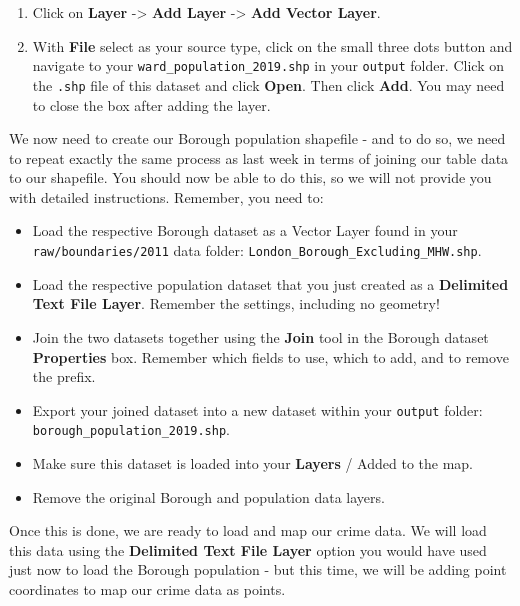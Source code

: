 \documentclass[
]{book}
\begin{document}
\begin{enumerate}
\def\labelenumi{\arabic{enumi}.}
\item
  Click on \textbf{Layer} -\textgreater{} \textbf{Add Layer} -\textgreater{} \textbf{Add Vector Layer}.
\item
  With \textbf{File} select as your source type, click on the small three dots button and navigate to your \texttt{ward\_population\_2019.shp} in your \texttt{output} folder. Click on the \texttt{.shp} file of this dataset and click \textbf{Open}. Then click \textbf{Add}. You may need to close the box after adding the layer.
\end{enumerate}

We now need to create our Borough population shapefile - and to do so, we need to repeat exactly the same process as last week in terms of joining our table data to our shapefile. You should now be able to do this, so we will not provide you with detailed instructions. Remember, you need to:

\begin{itemize}
\item
  Load the respective Borough dataset as a Vector Layer found in your \texttt{raw/boundaries/2011} data folder: \texttt{London\_Borough\_Excluding\_MHW.shp}.
\item
  Load the respective population dataset that you just created as a \textbf{Delimited Text File Layer}. Remember the settings, including no geometry!
\item
  Join the two datasets together using the \textbf{Join} tool in the Borough dataset \textbf{Properties} box. Remember which fields to use, which to add, and to remove the prefix.
\item
  Export your joined dataset into a new dataset within your \texttt{output} folder: \texttt{borough\_population\_2019.shp}.
\item
  Make sure this dataset is loaded into your \textbf{Layers} / Added to the map.
\item
  Remove the original Borough and population data layers.
\end{itemize}

Once this is done, we are ready to load and map our crime data. We will load this data using the \textbf{Delimited Text File Layer} option you would have used just now to load the Borough population - but this time, we will be adding point coordinates to map our crime data as points.
\end{document}
